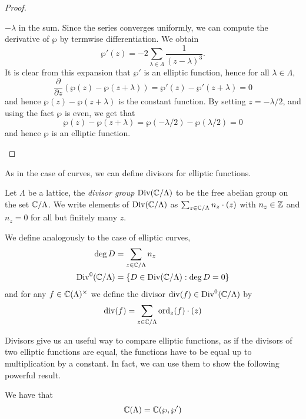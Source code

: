 \begin{proof}
\begin{enumerate}[label=(\alph*)]
		$-\lambda$ in the sum. Since the series converges uniformly,
		we can compute the derivative of $\wp$ by termwise differentiation.
		We obtain
		\begin{equation*}
			\wp'(z) = -2\sum_{\lambda \in \Lambda} \frac{1}{(z - \lambda)^3}.
		\end{equation*}
		It is clear from this expansion that $\wp'$ is an elliptic function,
		hence for all $\lambda \in \Lambda$,
		\begin{equation*}
			\frac{\partial}{\partial z}(\wp(z) - \wp(z + \lambda))
			= \wp'(z) - \wp'(z + \lambda) = 0
		\end{equation*}
		and hence $\wp(z) - \wp(z + \lambda)$ is the constant function.
		By setting $z = -\lambda/2$, and using the fact $\wp$ is even,
		we get that
		\begin{equation*}
			\wp(z) - \wp(z + \lambda) = \wp(-\lambda/2) - \wp(\lambda/2) = 0
		\end{equation*}
		and hence $\wp$ is an elliptic function.
	\end{enumerate}
\end{proof}

As in the case of curves, we can define divisors for elliptic
functions.
\begin{definition}
	Let $\Lambda$ be a lattice, the \emph{divisor group}
	$\operatorname{Div}(\mathbb{C}/\Lambda)$ to be the free abelian group on the set
	$\mathbb{C}/\Lambda$. We write elements of $\operatorname{Div}(\mathbb{C}/\Lambda)$ as
	$\sum_{z \in\mathbb{C}/\Lambda} n_z\cdot(z)$ with $n_z \in \mathbb{Z}$ and
	$n_z = 0$ for all but finitely many $z$.

	We define analogously to the case of elliptic curves,
	\begin{align*}
		\deg D &= \sum_{z \in \mathbb{C}/\Lambda} n_z\\
		\operatorname{Div}^0(\mathbb{C}/\Lambda) &= \{D \in \operatorname{Div}(\mathbb{C}/\Lambda): \deg D = 0\}
	\end{align*}
	and for any $f \in \mathbb{C}(\Lambda)^\times$ we define the divisor
	$\operatorname{div}(f) \in \operatorname{Div}^0(\mathbb{C}/\Lambda)$ by
	\begin{equation*}
		\operatorname{div}(f) = \sum_{z \in \mathbb{C}/\Lambda} \operatorname{ord}_z(f)\cdot(z)
	\end{equation*}
\end{definition}

Divisors give us an useful way to compare elliptic functions, as if
the divisors of two elliptic functions are equal, the functions have
to be equal up to multiplication by a constant.
In fact, we can use them to show the following powerful result.

\begin{theorem}
	\label{thm:wp-generates}
	We have that
	\begin{equation*}
		\mathbb{C}(\Lambda) = \mathbb{C}(\wp, \wp')
	\end{equation*}
\end{theorem}

